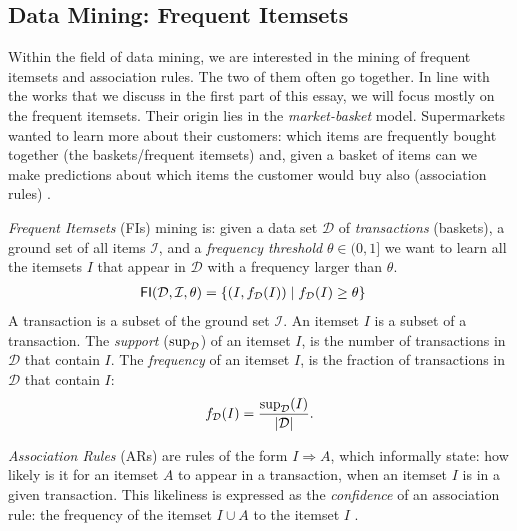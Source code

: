 \documentclass[../main.tex]{subfiles}
\begin{document}
\subsection{Data Mining: Frequent Itemsets}
\label{sec:I_data_mining}

Within the field of data mining, we are interested in the mining of frequent itemsets and association rules.
The two of them often go together.
In line with the works that we discuss in the first part of this essay, we will focus mostly on the frequent itemsets.
Their origin lies in the \emph{market-basket} model.
Supermarkets wanted to learn more about their customers:
which items are frequently bought together (the baskets/frequent itemsets)
and, given a basket of items can we make predictions about which items the customer would buy also (association rules)
\cite[Chapter~6]{Leskovec2014mining}.


\emph{Frequent Itemsets} (FIs) mining is: given a data set $\mathcal{D}$ of \emph{transactions} (baskets),
a ground set of all items $\mathcal{I}$, and a \emph{frequency threshold} $\theta \in (0,1]$
we want to learn all the itemsets $I$ that appear in $\mathcal{D}$ with a frequency larger than $\theta$.
\begin{align}
    \mathsf{FI}(\mathcal{D}, \mathcal{I}, \theta) &= \{(I, f_{\mathcal{D}}(I)) \mid f_{\mathcal{D}}(I) \ge \theta \}
\end{align}
A transaction is a subset of the ground set $\mathcal{I}$.
An itemset $I$ is a subset of a transaction.
The \emph{support} ($\sup_{\mathcal{D}}$) of an itemset $I$, is the number of transactions in $\mathcal{D}$ that contain $I$.
The \emph{frequency} of an itemset $I$, is the fraction of transactions in $\mathcal{D}$ that contain $I$:
\begin{align}
    f_{\mathcal{D}}(I) = \frac{\sup_{\mathcal{D}}(I)}{\lvert\mathcal{D}\rvert}.
\end{align}


\emph{Association Rules} (ARs) are rules of the form $I \Rightarrow A$,
which informally state: how likely is it for an itemset $A$ to appear in a transaction, when an itemset $I$ is in a given transaction.
This likeliness is expressed as the \emph{confidence} of an association rule: the frequency of the itemset $I \cup A$ to the itemset $I$
\cite{Riondato2012}.
\end{document}
